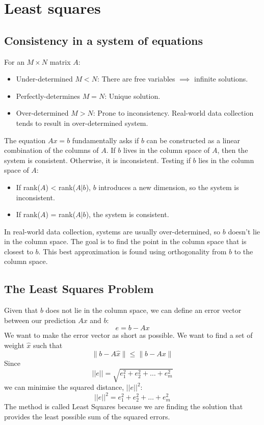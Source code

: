 \documentclass[../linear-algebra.tex]{subfiles}
\begin{document}
\section{Least squares}
\subsection{Consistency in a system of equations}
For an $M \times N$ matrix $A$:
\begin{itemize}
    \item Under-determined $M < N$: There are free variables $\implies$ infinite solutions.
    \item Perfectly-determines $M=N$: Unique solution.
    \item Over-determined $M > N$: Prone to inconsistency. Real-world data collection tends to result in over-determined system.
\end{itemize}
The equation $Ax=b$ fundamentally asks if $b$ can be constructed as a linear combination of the columns of $A$.\newline
If $b$ lives in the column space of $A$, then the system is consistent. Otherwise, it is inconsistent.\newline
Testing if $b$ lies in the column space of $A$:
\begin{itemize}
    \item If rank($A$) < rank($A|b$), $b$ introduces a new dimension, so the system is inconsistent.
    \item If rank($A$) = rank($A|b$), the system is consistent.
\end{itemize}
In real-world data collection, systems are usually over-determined, so $b$ doesn't lie in the column space.
The goal is to find the point in the column space that is closest to $b$. This best approximation is found using orthogonality from $b$ to the column space.

\subsection{The Least Squares Problem}
Given that $b$ does not lie in the column space, we can define an error vector between our prediction $Ax$ and $b$:
$$e = b - Ax$$
We want to make the error vector as short as possible. We want to find a set of weight $\hat{x}$ such that
$$\|b - A\hat{x}\| \leq \|b - Ax\|$$
Since
$$||e|| = \sqrt{e_1^2 + e_2^2 + \dots + e_m^2}$$
we can minimise the squared distance, $||e||^2$:
$$||e||^2 = e_1^2 + e_2^2 + \dots + e_m^2$$
The method is called Least Squares because we are finding the solution that provides the least possible sum of the squared errors.
\end{document}
